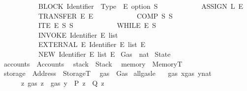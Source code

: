 \begin{isabellebody}
\ \ \ \ \ \ \ \ \ \ \ {\isacharbar}{\kern0pt}\ BLOCK\ {\isachardoublequoteopen}{\isacharparenleft}{\kern0pt}Identifier\ {\isasymtimes}\ Type{\isacharparenright}{\kern0pt}\ {\isasymtimes}\ {\isacharparenleft}{\kern0pt}E\ option{\isacharparenright}{\kern0pt}{\isachardoublequoteclose}\ S\isanewline
\ \ \ \ \ \ \ \ \ \ \ {\isacharbar}{\kern0pt}\ ASSIGN\ L\ E\isanewline
\ \ \ \ \ \ \ \ \ \ \ {\isacharbar}{\kern0pt}\ TRANSFER\ E\ E\isanewline
\ \ \ \ \ \ \ \ \ \ \ {\isacharbar}{\kern0pt}\ COMP\ S\ S\isanewline
\ \ \ \ \ \ \ \ \ \ \ {\isacharbar}{\kern0pt}\ ITE\ E\ S\ S\isanewline
\ \ \ \ \ \ \ \ \ \ \ {\isacharbar}{\kern0pt}\ WHILE\ E\ S\isanewline
\ \ \ \ \ \ \ \ \ \ \ {\isacharbar}{\kern0pt}\ INVOKE\ Identifier\ {\isachardoublequoteopen}E\ list{\isachardoublequoteclose}\isanewline
\ \ \ \ \ \ \ \ \ \ \ {\isacharbar}{\kern0pt}\ EXTERNAL\ E\ Identifier\ {\isachardoublequoteopen}E\ list{\isachardoublequoteclose}\ E\isanewline
\ \ \ \ \ \ \ \ \ \ \ {\isacharbar}{\kern0pt}\ NEW\ Identifier\ {\isachardoublequoteopen}E\ list{\isachardoublequoteclose}\ E%
\isadelimdocument
%
\endisadelimdocument
%
\isatagdocument
%
\isamarkuptrue%
%
\endisatagdocument
{\isafolddocument}%
%
\isadelimdocument
%
\endisadelimdocument
{}\isamarkupfalse%
\ Gas\ {\isacharequal}{\kern0pt}\ nat\isanewline
\isanewline
\isanewline
{}\isamarkupfalse%
\ State\ {\isacharequal}{\kern0pt}\ \ \ \isanewline
\ \ accounts\ {\isacharcolon}{\kern0pt}{\isacharcolon}{\kern0pt}\ Accounts\isanewline
\ \ stack\ {\isacharcolon}{\kern0pt}{\isacharcolon}{\kern0pt}\ Stack\isanewline
\ \ memory\ {\isacharcolon}{\kern0pt}{\isacharcolon}{\kern0pt}\ MemoryT\isanewline
\ \ storage\ {\isacharcolon}{\kern0pt}{\isacharcolon}{\kern0pt}\ {\isachardoublequoteopen}Address\ {\isasymRightarrow}\ StorageT{\isachardoublequoteclose}\isanewline
\ \ gas\ {\isacharcolon}{\kern0pt}{\isacharcolon}{\kern0pt}\ Gas\isanewline
\isanewline
{}\isamarkupfalse%
\ all{\isacharunderscore}{\kern0pt}gas{\isacharunderscore}{\kern0pt}le{\isacharcolon}{\kern0pt}\isanewline
\ \ \ {\isachardoublequoteopen}gas\ x{\isacharless}{\kern0pt}{\isacharparenleft}{\kern0pt}gas\ y{\isacharcolon}{\kern0pt}{\isacharcolon}{\kern0pt}nat{\isacharparenright}{\kern0pt}{\isachardoublequoteclose}\isanewline
\ \ \ \ \ \ \ {\isachardoublequoteopen}{\isasymforall}z{\isachardot}{\kern0pt}\ gas\ z\ {\isacharless}{\kern0pt}\ gas\ y\ {\isasymlongrightarrow}\ P\ z\ {\isasymlongrightarrow}\ Q\ z{\isachardoublequoteclose}\isanewline

\end{isabellebody}

